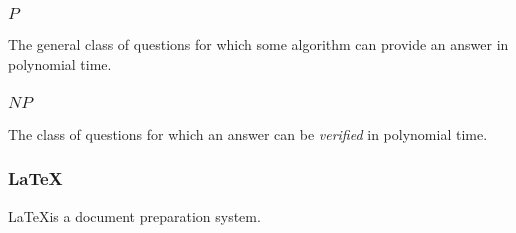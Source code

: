 \subsubsection*{\(P\)}

The general class of questions for which some algorithm can provide an answer in polynomial time.

\subsubsection*{\(NP\)}

The class of questions for which an answer can be \emph{verified} in polynomial time.

\subsubsection*{\LaTeX}

\LaTeX is a document preparation system.
